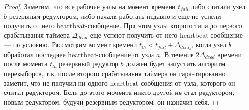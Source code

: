\begin{proof}
    Заметим, что все рабочие узлы на момент времени $t_{fail}$ либо считали узел $b$ резервным редуктором, либо начали работать недавно и еще не успели получить от него heartbeat-со\-об\-ще\-ние. При этом узлы второго типа до первого срабатывания таймера $\Delta_{dead}$ еще успеют получить от него heartbeat-со\-об\-ще\-ние --- по условию. Рассмотрим момент времени $t_{lh} < t_{fail} + \Delta_{delay}$, когда узел $b$ обработал последнее heartbeat-со\-об\-ще\-ние от узла $a$. В течение $2\Delta_{dead}$ времени после момента $t_{lh}$ резервный редуктор $b$ должен будет запустить алгоритм перевыборов, т.к. после второго срабатывания таймера он гарантированно заметит, что не получил ни одного heartbeat-со\-об\-ще\-ния от узла, которого он считал редуктором. Если до этого момента никто другой не стал редуктором, новым редуктором, будучи резервным редуктором, он назначит себя.
    

\end{proof}
